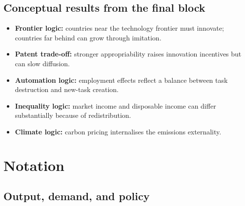 \documentclass[12pt]{article}
\begin{document}
\subsection*{Conceptual results from the final block}

\begin{itemize}[leftmargin=1.5em]
\item \textbf{Frontier logic:} countries near the technology frontier must innovate; countries far behind can grow through imitation.
\item \textbf{Patent trade-off:} stronger appropriability raises innovation incentives but can slow diffusion.
\item \textbf{Automation logic:} employment effects reflect a balance between task destruction and new-task creation.
\item \textbf{Inequality logic:} market income and disposable income can differ substantially because of redistribution.
\item \textbf{Climate logic:} carbon pricing internalises the emissions externality.
\end{itemize}



\newpage
\section{Notation}

\subsection*{Output, demand, and policy}
\end{document}
